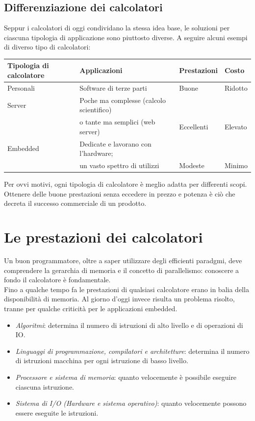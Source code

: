 \subsection{Differenziazione dei calcolatori}
Seppur i calcolatori di oggi condividano la stessa idea base, le soluzioni per ciascuna tipologia di applicazione sono piuttosto diverse. A seguire alcuni esempi di diverso tipo di calcolatori:
\begin{table}[h!]
	\begin{tabular}{l|l|l|l}
		\rowcolor[HTML]{EFEFEF} 
		Tipologia di calcolatore & Applicazioni & Prestazioni & Costo \\ \hline
		Personali & Software di terze parti & Buone & Ridotto \\
		Server & Poche ma complesse (calcolo scientifico) \\
		& o tante ma semplici (web server) & Eccellenti  & Elevato \\
		Embedded & Dedicate e lavorano con l'hardware; \\
		& un vasto spettro di utilizzi & Modeste & Minimo 
	\end{tabular}
\end{table}
Per ovvi motivi, ogni tipologia di calcolatore è meglio adatta per differenti scopi. Ottenere delle buone prestazioni senza eccedere in prezzo e potenza è ciò che decreta il successo commerciale di un prodotto.

\section{Le prestazioni dei calcolatori}
Un buon programmatore, oltre a saper utilizzare degli efficienti paradgmi, deve comprendere la gerarchia di memoria e il concetto di parallelismo: conoscere a fondo il calcolatore è fondamentale.\\
Fino a qualche tempo fa le prestazioni di qualsiasi calcolatore erano in balia della disponibilità di memoria. Al giorno d'oggi invece risulta un problema risolto, tranne per qualche criticità per le applicazioni embedded.\\
\begin{itemize}[noitemsep, nolistsep]
	\item \textit{Algoritmi}: determina il numero di istruzioni di alto livello e di operazioni di IO.
	\item \textit{Linguaggi di programmazione, compilatori e architetture}: determina il numero di istruzioni macchina per ogni istruzione di basso livello.
	\item \textit{Processore e sistema di memoria}: quanto velocemente è possibile eseguire ciascuna istruzione.
	\item \textit{Sistema di I/O (Hardware e sistema operativo)}: quanto velocemente possono essere eseguite le istruzioni.
\end{itemize}

